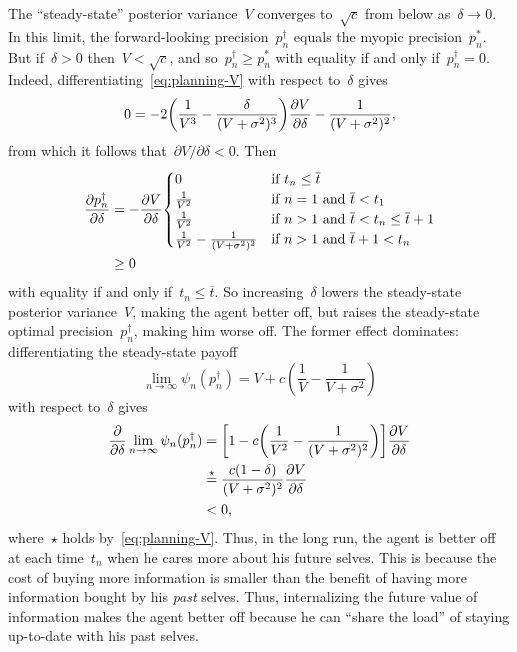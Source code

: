 \documentclass[11pt,oneside]{article}
\begin{document}
The ``steady-state'' posterior variance~$V$ converges to~$\sqrt{c}$ from below as~$\delta\to0$.
In this limit, the forward-looking precision~$p_n^\dag$ equals the myopic precision~$p_n^*$.
But if~$\delta>0$ then~$V<\sqrt{c}$, and so~$p_n^\dag\ge p_n^*$ with equality if and only if~$p_n^\dag=0$.
Indeed, differentiating~\eqref{eq:planning-V} with respect to~$\delta$ gives
\[ 0=-2\left(\frac{1}{V^3}-\frac{\delta}{(V+\sigma^2)^3}\right)\parfrac{V}{\delta}-\frac{1}{(V+\sigma^2)^2}, \]
from which it follows that~$\partial V/\partial\delta<0$.
Then
%
\begin{align*}
    \parfrac{p_n^\dag}{\delta}
    &= -\parfrac{V}{\delta}\begin{cases}
        0 & \text{if}\ t_n\le\overline{t} \\
        \frac{1}{V^2} & \text{if}\ n=1\ \text{and}\ \overline{t}<t_1 \\
        \frac{1}{V^2} & \text{if}\ n>1\ \text{and}\ \overline{t}<t_n\le\overline{t}+1 \\
        \frac{1}{V^2}-\frac{1}{(V+\sigma^2)^2} & \text{if}\ n>1\ \text{and}\ \overline{t}+1<t_n
    \end{cases} \\
    &\ge 0
\end{align*}
%
with equality if and only if~$t_n\le\overline{t}$.
So increasing~$\delta$ lowers the steady-state posterior variance~$V$, making the agent better off, but raises the steady-state optimal precision~$p_n^\dag$, making him worse off.
The former effect dominates: differentiating the steady-state payoff
\[ \lim_{n\to\infty}\psi_n(p_n^\dag)=V+c\left(\frac{1}{V}-\frac{1}{V+\sigma^2}\right)\]
with respect to~$\delta$ gives
%
\begin{align*}
    \parfrac{}{\delta}\lim_{n\to\infty}\psi_n(p_n^\dag)
    &= \left[1-c\left(\frac{1}{V^2}-\frac{1}{(V+\sigma^2)^2}\right)\right]\parfrac{V}{\delta} \\
    &\overset{\star}{=} \frac{c(1-\delta)}{(V+\sigma^2)^2}\parfrac{V}{\delta} \\
    &< 0,
\end{align*}
%
where~$\star$ holds by~\eqref{eq:planning-V}.
Thus, in the long run, the agent is better off at each time~$t_n$ when he cares more about his future selves.
This is because the cost of buying more information is smaller than the benefit of having more information bought by his \emph{past} selves.
Thus, internalizing the future value of information makes the agent better off because he can ``share the load'' of staying up-to-date with his past selves.
\end{document}
